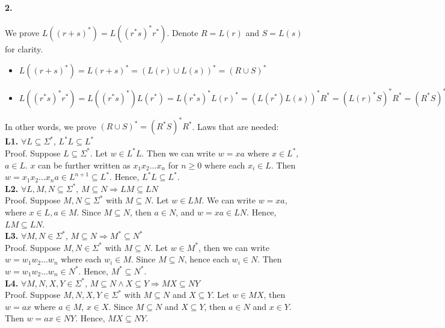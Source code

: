 \documentclass[12pt]{article}
\begin{document}
\paragraph*{2.} We prove \(L((r+s)^*) = L((r^*s)^*r^*)\). Denote \(R = L(r)\) and \(S = L(s)\) for clarity.
\begin{itemize}
  \item \(L((r+s)^*) = L(r+s)^* = (L(r) \cup L(s))^* = (R \cup S)^*\)
  \item \(L((r^*s)^*r^*) =  L((r^*s)^*)L(r^*) = L(r^*s)^*L(r)^* = (L(r^*)L(s))^*R^* = (L(r)^*S)^*R^* = (R^*S)^*R^*\)
\end{itemize}
In other words, we prove \((R \cup S)^* = (R^*S)^*R^*\). Laws that are needed:\\
\textbf{L1.} \(\forall L \subseteq \Sigma^*\), \(L^*L \subseteq L^*\)\\
Proof. Suppose \(L \subseteq \Sigma^*\). Let \(w \in L^*L\). Then we can write \(w = xa\) where \(x \in L^*\), \(a \in L\). \(x\) can be further written as \(x_1x_2...x_n\) for \(n \geq 0\) where each \(x_i \in L\). Then \(w = x_1x_2...x_na \in L^{n+1} \subseteq L^*\). Hence, \(L^*L \subseteq L^*\).\\
\textbf{L2.} \(\forall L, M, N \subseteq \Sigma^*\), \(M \subseteq N \Rightarrow LM \subseteq LN\)\\
Proof. Suppose \(M, N \subseteq \Sigma^*\) with \(M \subseteq N\). Let \(w \in LM\). We can write \(w = xa\), where \(x \in L, a \in M\). Since \(M \subseteq N\), then \(a \in N\), and \(w = xa \in LN\). Hence, \(LM 
\subseteq LN\).\\
\textbf{L3.} \(\forall M,N \in \Sigma^*\), \(M \subseteq N \Rightarrow M^* \subseteq N^*\)\\
Proof. Suppose \(M,N \in \Sigma^*\) with \(M \subseteq N\). Let \(w \in M^*\), then we can write \(w = w_1w_2...w_n\) where each \(w_i \in M\). Since \(M \subseteq N\), hence each \(w_i \in N\). Then \(w = w_1w_2...w_n \in N^*\). Hence, \(M^* \subseteq N^*\).\\
\textbf{L4.} \(\forall M,N,X,Y \in \Sigma^*\), \(M \subseteq N \land X \subseteq Y \Rightarrow MX \subseteq NY\)\\
Proof. Suppose \(M,N,X,Y \in \Sigma^*\) with \(M \subseteq N\) and \(X \subseteq Y\). Let \(w \in MX\), then \(w = ax\) where \(a \in M\), \(x \in X\). Since \(M \subseteq N\) and \(X \subseteq Y\), then \(a \in N\) and \(x \in Y\). Then \(w = ax \in NY\). Hence, \(MX \subseteq NY\).
\end{document}
